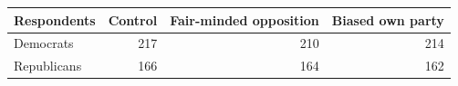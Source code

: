 \begin{tabular}{lrrr}
\toprule
Respondents & Control & Fair-minded opposition & Biased own party \\
\midrule
Democrats & 217 & 210 & 214 \\
Republicans & 166 & 164 & 162 \\
\bottomrule
\end{tabular}
